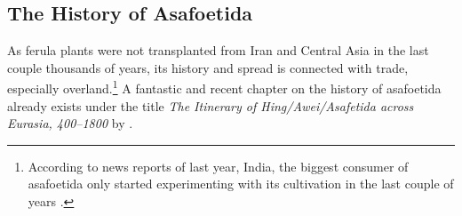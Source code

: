 





\subsection{The History of Asafoetida}

As ferula plants were not transplanted from Iran and Central Asia in the last couple thousands of years, its history and spread is connected with trade, especially overland.\footnote{According to news reports of last year, India, the biggest consumer of asafoetida only started experimenting with its cultivation in the last couple of years \autocite{express_news_service_taking_2021}.}   
A fantastic and recent chapter on the history of asafoetida already exists under the title \textit{The Itinerary of Hing/Awei/Asafetida
across Eurasia, 400–1800} by \textcite{leung_itinerary_2019}.

